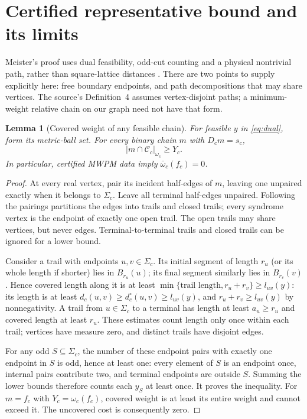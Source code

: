 \documentclass[11pt]{article}
\theoremstyle{definition}
\theoremstyle{plain}
\newtheorem{lemma}[definition]{Lemma}
\theoremstyle{remark}
\begin{document}
\section{Certified representative bound and its limits}\label{sec:bound}
Meister's proof uses dual feasibility, odd-cut counting and a
physical nontrivial path, rather than square-lattice distances
\cite[Lemmas~11--12, Theorem~13]{Meister}.
There are two points to supply explicitly here: free boundary
endpoints, and path decompositions that may share vertices.
The source's Definition~4 assumes vertex-disjoint paths; a
minimum-weight relative chain on our graph need not have that form.

\begin{lemma}[Covered weight of any feasible chain]\label{lem:coverage}
For feasible $y$ in \eqref{eq:dual}, form its metric-ball set.
For every binary chain $m$ with $D_cm=s_c$,
\[
 |m\cap\mathcal C_c|_{\omega_c}\ge Y_c .
\]
In particular, certified MWPM data imply
$\bar\omega_c(f_c)=0$.
\end{lemma}
\begin{proof}
At every real vertex, pair its incident half-edges of $m$, leaving
one unpaired exactly when it belongs to $\Sigma_c$. Leave all
terminal half-edges unpaired. Following the pairings partitions
the edges into trails and closed trails; every syndrome vertex
is the endpoint of exactly one open trail. The open trails may
share vertices, but never edges. Terminal-to-terminal trails and
closed trails can be ignored for a lower bound.

Consider a trail with endpoints $u,v\in\Sigma_c$.
Its initial segment of length $r_u$ (or its whole length if shorter)
lies in $B_{r_u}(u)$; its final segment similarly lies in $B_{r_v}(v)$.
Hence covered length along it is at least
$\min\{\text{trail length},r_u+r_v\}\ge l_{uv}(y)$:
its length is at least $d_c(u,v)\ge d_c^\circ(u,v)\ge l_{uv}(y)$,
and $r_u+r_v\ge l_{uv}(y)$ by nonnegativity.
A trail from $u\in\Sigma_c$ to a terminal has length at least
$a_u\ge r_u$ and covered length at least $r_u$.
These estimates count length only once within each trail; vertices
have measure zero, and distinct trails have disjoint edges.

For any odd $S\subseteq\Sigma_c$, the number of these endpoint pairs
with exactly one endpoint in $S$ is odd, hence at least one:
every element of $S$ is an endpoint once, internal pairs contribute
two, and terminal endpoints are outside $S$.
Summing the lower bounds therefore counts each $y_S$ at least once.
It proves the inequality. For $m=f_c$ with
$Y_c=\omega_c(f_c)$, covered weight is at least its entire weight
and cannot exceed it. The uncovered cost is consequently zero.
\end{proof}
\end{document}
